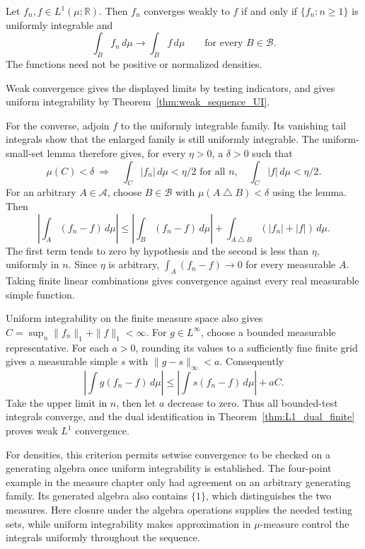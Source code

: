 \begin{theorem}
\label{thm:generating_algebra_weak_L1}
Let $f_n,f\in L^1(\mu;\mathbb R)$. Then $f_n$ converges weakly
to $f$ if and only if $\{f_n:n\geq1\}$ is uniformly integrable and
\[
\int_B f_n\,d\mu\longrightarrow\int_B f\,d\mu
\qquad\text{for every }B\in\mathcal B.
\]
The functions need not be positive or normalized densities.
\end{theorem}
\Proof
Weak convergence gives the displayed limits by testing indicators,
and gives uniform integrability by
Theorem~\ref{thm:weak_sequence_UI}.

For the converse, adjoin $f$ to the uniformly integrable family.
Its vanishing tail integrals show that the enlarged family is still
uniformly integrable. The uniform-small-set lemma therefore gives,
for every $\eta>0$, a $\delta>0$ such that
\[
\mu(C)<\delta\ \Longrightarrow\quad
\int_C|f_n|\,d\mu<\eta/2\text{ for all }n,
\quad \int_C|f|\,d\mu<\eta/2.
\]
For an arbitrary $A\in\mathcal A$, choose $B\in\mathcal B$ with
$\mu(A\mathbin\triangle B)<\delta$ using the lemma. Then
\[
\left|\int_A(f_n-f)\,d\mu\right|
\leq\left|\int_B(f_n-f)\,d\mu\right|
  +\int_{A\mathbin\triangle B}(|f_n|+|f|)\,d\mu.
\]
The first term tends to zero by hypothesis and the second is less
than $\eta$, uniformly in $n$. Since $\eta$ is arbitrary,
$\int_A(f_n-f)\to0$ for every measurable $A$. Taking finite linear
combinations gives convergence against every real measurable simple
function.

Uniform integrability on the finite measure space also gives
$C=\sup_n\|f_n\|_1+\|f\|_1<\infty$.
For $g\in L^\infty$, choose a bounded measurable representative.
For each $a>0$, rounding its values to a sufficiently fine finite
grid gives a measurable simple $s$ with $\|g-s\|_\infty<a$.
Consequently
\[
\left|\int g(f_n-f)\,d\mu\right|
\leq\left|\int s(f_n-f)\,d\mu\right|+aC.
\]
Take the upper limit in $n$, then let $a$ decrease to zero. Thus all
bounded-test integrals converge, and the dual identification in
Theorem~\ref{thm:L1_dual_finite} proves weak $L^1$ convergence.
\Done

For densities, this criterion permits setwise convergence to be checked
on a generating algebra once uniform integrability is established.
The four-point example in the measure chapter only had agreement on
an arbitrary generating family. Its generated algebra also contains
$\{1\}$, which distinguishes the two measures. Here closure under
the algebra operations supplies the needed testing sets, while uniform
integrability makes approximation in $\mu$-measure control the integrals
uniformly throughout the sequence.

